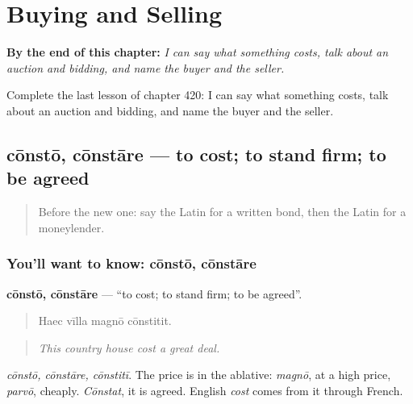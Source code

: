 
\chapter{Buying and Selling}
\label{ch:la-buying-and-selling}

\begin{chapteropening}
\textbf{By the end of this chapter:} \emph{I can say what something costs, talk about an auction and bidding, and name the buyer and the seller.}

Complete the last lesson of chapter 420: I can say what something costs, talk about an auction and bidding, and name the buyer and the seller.
\end{chapteropening}

\section[cōnstō, cōnstāre]{cōnstō, cōnstāre — to cost; to stand firm; to be agreed}

\label{lesson:LA-C420-consto}



\begin{quote}
Before the new one: say the Latin for a written bond, then the Latin for a moneylender.
\end{quote}

\subsection*{You'll want to know: cōnstō, cōnstāre}
\textbf{cōnstō, cōnstāre} — \textquotedblleft{}to cost; to stand firm; to be agreed\textquotedblright{}.

\begin{quote}
Haec vīlla magnō cōnstitit.
\end{quote}

\begin{quote}
\emph{This country house cost a great deal.}
\end{quote}

\emph{cōnstō, cōnstāre, cōnstitī}. The price is in the ablative: \emph{magnō}, at a high price, \emph{parvō}, cheaply. \emph{Cōnstat}, it is agreed. English \emph{cost} comes from it through French.

